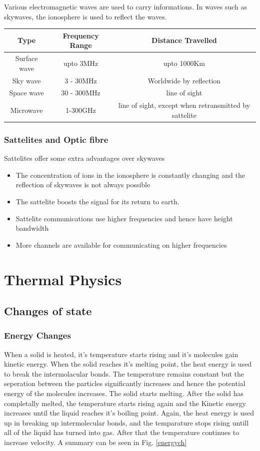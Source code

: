 \documentclass{scrbook}
\begin{document}
	Various electromagnetic waves are used to carry informations. In waves such as skywaves, the ionosphere is used to reflect the waves.

	\begin{tabular}{| c | c | c |}
		\hline
		Type & Frequency Range & Distance Travelled \\
		\hline
		Surface wave & upto 3MHz & upto 1000Km \\
		Sky wave & 3 - 30MHz & Worldwide by reflection \\
		Space wave & 30 - 300MHz & line of sight \\
		Microwave & 1-300GHz & line of sight, except when retransmitted by sattelite \\
		\hline
	\end{tabular}

\subsection{Sattelites and Optic fibre}

	Sattelites offer some extra advantages over skywaves

	\begin{itemize}
		\item
			The concentration of ions in the ionosphere is constantly changing and the reflection of skywaves is not always possible
		\item
			The sattelite boosts the signal for its return to earth.
		\item
			Sattelite communications use higher frequencies and hence have height bandwidth
		\item
			More channels are available for communicating on higher frequencies
	\end{itemize}

\chapter{Thermal Physics}

\section{Changes of state}

\subsection{Energy Changes}

       When a solid is heated, it's temperature starts rising and it's molecules gain kinetic energy. When the solid reaches it's melting point, the heat energy is used to break the intermolacular bonds. The temperature remains constant but the seperation between the particles significantly increases and hence the potential energy of the molecules increases. The solid starts melting. After the solid has completally melted, the temperature starts rising again and the Kinetic energy increases until the liquid reaches it's boiling point. Again, the heat energy is used up in breaking up intermolecular bonds, and the temparature stops rising untill all of the liquid has turned into gas. After that the temperature continues to increase velocity. A summary can be seen in Fig. \ref{energych}
\end{document}
